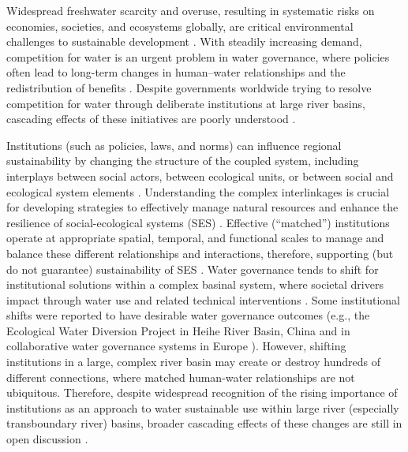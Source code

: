Widespread freshwater scarcity and overuse, resulting in systematic risks on economies, societies, and ecosystems globally, are critical environmental challenges to sustainable development \cite{distefano2017, dolan2021, xu2020b, mekonnen2016}.
With steadily increasing demand, competition for water is an urgent problem in water governance, where policies often lead to long-term changes in human–water relationships and the redistribution of benefits \cite{gleick2010, ziolkowska2016, wang2019d}.
Despite governments worldwide trying to resolve competition for water through deliberate institutions at large river basins, cascading effects of these initiatives are poorly understood \cite{giuliani2013, falkenmark2019, jaeger2019}.

Institutions (such as policies, laws, and norms) can influence regional sustainability by changing the structure of the coupled system, including interplays between social actors, between ecological units, or between social and ecological system elements \cite{young2008,cumming2020b,lien2020, bodin2017b}.
Understanding the complex interlinkages is crucial for developing strategies to effectively manage natural resources and enhance the resilience of social-ecological systems (SES) \cite{kluger2020}.
Effective (“matched”) institutions operate at appropriate spatial, temporal, and functional scales to manage and balance these different relationships and interactions, therefore, supporting (but do not guarantee) sustainability of SES \cite{epstein2015, wang2019d}.
Water governance tends to shift for institutional solutions within a complex basinal system, where societal drivers impact through water use and related technical interventions \cite{fischer2020}.
Some institutional shifts were reported to have desirable water governance outcomes (e.g., the Ecological Water Diversion Project in Heihe River Basin, China \cite{wang2019d} and in collaborative water governance systems in Europe \cite{green2013}).
However, shifting institutions in a large, complex river basin may create or destroy hundreds of different connections, where matched human-water relationships are not ubiquitous.
Therefore, despite widespread recognition of the rising importance of institutions as an approach to water sustainable use within large river (especially transboundary river) basins, broader cascading effects of these changes are still in open discussion \cite{agrawal2003, persha2011, agrawal2001}.

